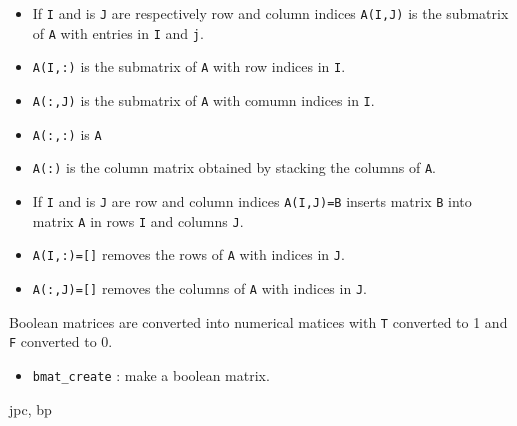 \begin{itemize}
   \item If \verb+I+ and is \verb+J+ are respectively row and column indices \verb+A(I,J)+ is the submatrix of \verb+A+ with entries in \verb+I+ and \verb+j+.
   \item \verb+A(I,:)+ is the submatrix of \verb+A+ with row indices in \verb+I+.
   \item \verb+A(:,J)+ is the submatrix of \verb+A+ with comumn indices in \verb+I+.
   \item \verb+A(:,:)+ is \verb+A+
   \item \verb+A(:)+  is the column matrix obtained by stacking the columns of \verb+A+.
\end{itemize}
\begin{itemize}
   \item If \verb+I+ and is \verb+J+ are row and column indices \verb+A(I,J)=B+ inserts
matrix \verb+B+ into matrix \verb+A+ in rows \verb+I+ and columns \verb!J!.
   \item \verb+A(I,:)=[]+ removes the rows of \verb+A+ with indices in \verb+J+.
   \item \verb+A(:,J)=[]+ removes the columns of \verb+A+ with indices in \verb+J+.
\end{itemize}

Boolean matrices are converted into numerical matices with \verb+T+ converted to 1 and \verb+F+ converted to 0.
\begin{itemize}
\item \verb+bmat_create+ : make a boolean matrix.
\end{itemize}
\begin{manseealso}

\end{manseealso}

\begin{authors}
   jpc, bp
\end{authors}
